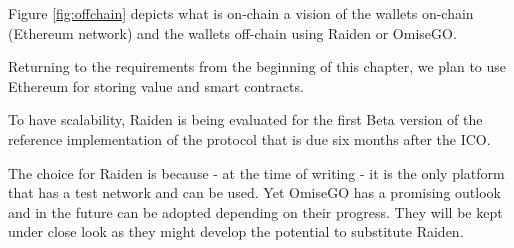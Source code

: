 Figure \ref{fig:offchain} depicts what is on-chain a vision of the wallets on-chain (Ethereum network) and the wallets off-chain using Raiden or OmiseGO.


Returning to the requirements from the beginning of this chapter, we plan to use Ethereum for storing value and smart contracts. 

To have scalability, Raiden is being evaluated for the first Beta version of the reference implementation of the protocol that is due six months after the ICO. %

The choice for Raiden is because - at the time of writing - it is the only platform that has a test network and can be used. Yet OmiseGO has a promising outlook and in the future can be adopted depending on their progress. They will be kept under close look as they might develop the potential to substitute Raiden.




